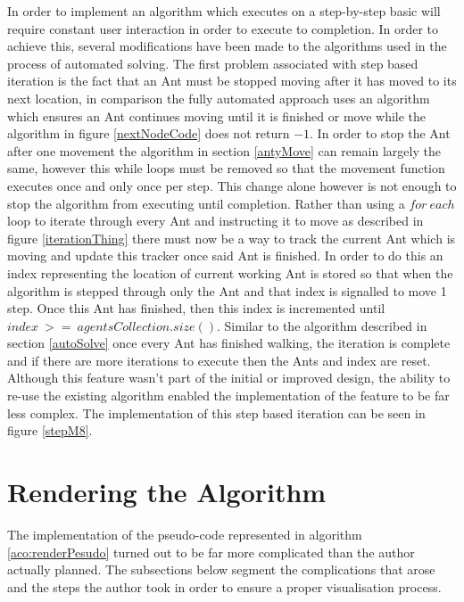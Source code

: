 In order to implement an algorithm which executes on a step-by-step basic will require constant user interaction in order to execute to completion. In order to achieve this, several modifications have been made to the algorithms used in the process of automated solving. The first problem associated with step based iteration is the fact that an Ant must be stopped moving after it has moved to its next location, in comparison the fully automated approach uses an algorithm which ensures an Ant continues moving until it is finished or move while the algorithm in figure \ref{nextNodeCode} does not return $-1$. In order to stop the Ant after one movement the algorithm in section \ref{antyMove} can remain largely the same, however this while loops must be removed so that the movement function executes once and only once per step. This change alone however is not enough to stop the algorithm from executing until completion. Rather than using a $for\ each$ loop to iterate through every Ant and instructing it to move as described in figure \ref{iterationThing} there must now be a way to track the current Ant which is moving and update this tracker once said Ant is finished. In order to do this an index representing the location of current working Ant is stored so that when the algorithm is stepped through only the Ant and that index is signalled to move 1 step. Once this Ant has finished, then this index is incremented until $index\ >=\ agentsCollection.size()$. Similar to the algorithm described in section \ref{autoSolve} once every Ant has finished walking, the iteration is complete and if there are more iterations to execute then the Ants and index are reset. Although this feature wasn’t part of the initial or improved design, the ability to re-use the existing algorithm enabled the implementation of the feature to be far less complex. The implementation of this step based iteration can be seen in figure \ref{stepM8}.

\section{Rendering the Algorithm}

The implementation of the pseudo-code represented in algorithm \ref{aco:renderPesudo} turned out to be far more complicated than the author actually planned. The subsections below segment the complications that arose and the steps the author took in order to ensure a proper visualisation process.

